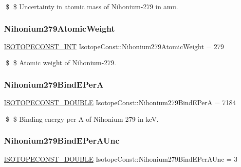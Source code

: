 \$ \$ Uncertainty in atomic mass of Nihonium-\/279 in amu. \mbox{\label{group___isotope_const-_nihonium-_nh279_gad3a12981590f34636a35fa22931e727b}} 
\subsubsection{\texorpdfstring{Nihonium279\+Atomic\+Weight}{Nihonium279AtomicWeight}}
{\footnotesize\ttfamily \mbox{\hyperlink{group___isotope_const-_macros_ga5f18360b3e99483a35c32d789e62621c}{I\+S\+O\+T\+O\+P\+E\+C\+O\+N\+S\+T\+\_\+\+I\+NT}} Isotope\+Const\+::\+Nihonium279\+Atomic\+Weight = 279}

\$ \$ Atomic weight of Nihonium-\/279. \mbox{\label{group___isotope_const-_nihonium-_nh279_ga92d2d6a0df50c0b7c707da4fc31da74e}} 
\subsubsection{\texorpdfstring{Nihonium279\+Bind\+E\+PerA}{Nihonium279BindEPerA}}
{\footnotesize\ttfamily \mbox{\hyperlink{group___isotope_const-_macros_ga8f45a7272ce02c0b4c65c44636ed719a}{I\+S\+O\+T\+O\+P\+E\+C\+O\+N\+S\+T\+\_\+\+D\+O\+U\+B\+LE}} Isotope\+Const\+::\+Nihonium279\+Bind\+E\+PerA = 7184}

\$ \$ Binding energy per A of Nihonium-\/279 in keV. \mbox{\label{group___isotope_const-_nihonium-_nh279_ga6503a542eaea3790df4d36ded7c74961}} 
\subsubsection{\texorpdfstring{Nihonium279\+Bind\+E\+Per\+A\+Unc}{Nihonium279BindEPerAUnc}}
{\footnotesize\ttfamily \mbox{\hyperlink{group___isotope_const-_macros_ga8f45a7272ce02c0b4c65c44636ed719a}{I\+S\+O\+T\+O\+P\+E\+C\+O\+N\+S\+T\+\_\+\+D\+O\+U\+B\+LE}} Isotope\+Const\+::\+Nihonium279\+Bind\+E\+Per\+A\+Unc = 3}

